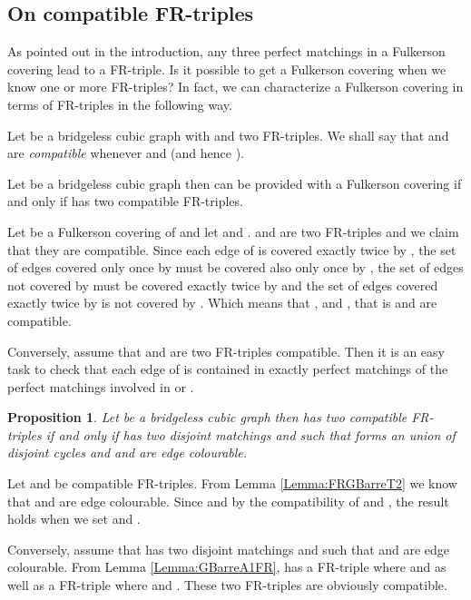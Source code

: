 \documentclass{amsart}
\newtheorem{prop}[thm]{Proposition}
\theoremstyle{definition}
\theoremstyle{remark}
\newenvironment{prf}{{\bf \noindent Proof } }{\hfill\\}
\begin{document}
\subsection{On compatible FR-triples}
As pointed out in the introduction, any three perfect matchings in a
Fulkerson covering lead to a FR-triple. Is it possible to get a
Fulkerson covering when we know one or more FR-triples?   In fact,
we can characterize a Fulkerson covering in terms of FR-triples in
the following way.

Let  be a bridgeless cubic graph with  and  two
FR-triples. We shall say that  and  are
{\em compatible} whenever  and  (and
hence  ).


\begin{thm}\label{Theorem:CompatibleFRTriples}
Let  be a bridgeless cubic graph then  can be provided with a
Fulkerson covering if and only if  has  two compatible
FR-triples.
\end{thm}

\begin{prf}
Let  be a Fulkerson covering of
 and let  and .  and  are two
FR-triples and we claim that they are compatible. Since each edge of
  is covered exactly twice by ,  the set of
edges covered only once by  must be covered also only
once by ,  the set of edges not covered by
 must be covered exactly twice by  and
 the set of edges covered exactly twice by  is
not covered by . Which means that ,
 and , that is  and
 are compatible.


Conversely, assume that  and  are two
FR-triples compatible. Then it is an easy task to check that each
edge of  is contained in exactly  perfect matchings of the 
perfect matchings involved in  or .
\end{prf}

\begin{prop}\label{Proposition:EquivalenceFRTripleFulkerson}
Let  be a bridgeless cubic graph then  has two compatible
FR-triples if and only if  has  two disjoint matchings 
and  such that  forms an union of disjoint cycles and  and
 are edge colourable.
\end{prop}
\begin{prf}
Let  and  be  compatible FR-triples.
From Lemma \ref{Lemma:FRGBarreT2} we know that
 and  are edge
colourable. Since  and  by the
compatibility of  and , the result holds
when we set  and .


Conversely, assume that  has  two disjoint matchings  and
 such that  and 
are edge colourable. From Lemma \ref{Lemma:GBarreA1FR},  has
a FR-triple  where  and  as
well as a FR-triple  where  and
. These two FR-triples are obviously compatible.
\end{prf}
\end{document}
